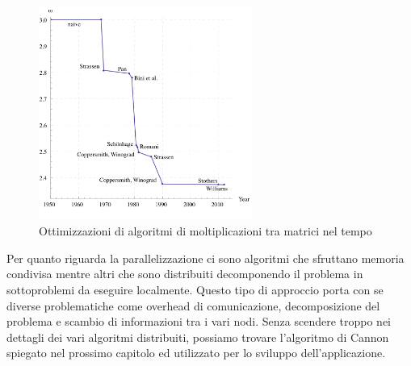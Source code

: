 \begin{figure}[htbp]
    \begin{center}
        \includegraphics[width=7cm]{immagini/matrix_algorithms.png}
    \end{center}
    \caption{Ottimizzazioni di algoritmi di moltiplicazioni tra matrici nel tempo}
    \label{fig:matrix_algo}
\end{figure}

Per quanto riguarda la parallelizzazione ci sono algoritmi che sfruttano memoria condivisa mentre altri che sono distribuiti decomponendo il problema in sottoproblemi da eseguire localmente. Questo tipo di approccio porta con se diverse problematiche come overhead di comunicazione, decomposizione del problema e scambio di informazioni tra i vari nodi.
Senza scendere troppo nei dettagli dei vari algoritmi distribuiti, possiamo trovare l'algoritmo di Cannon spiegato nel prossimo capitolo ed utilizzato per lo sviluppo dell'applicazione.
